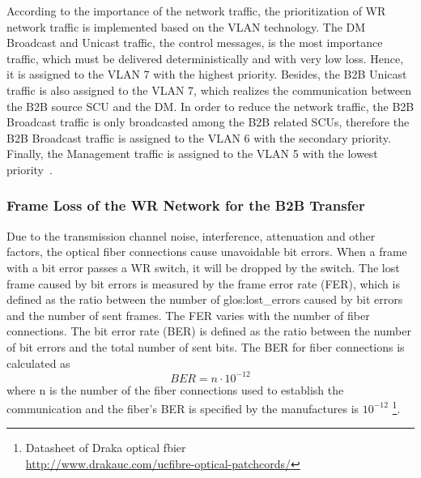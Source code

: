 According to the importance of the network traffic, the prioritization of WR network traffic is implemented based on the VLAN technology. The DM Broadcast and Unicast traffic, the control messages, is the most importance traffic, which must be delivered  deterministically and with very low loss. Hence, it is assigned to the VLAN 7 with the highest priority. Besides, the B2B Unicast traffic is also assigned to the VLAN 7, which realizes the communication between the B2B source SCU and the DM. In order to reduce the network traffic, the B2B Broadcast traffic is only broadcasted among the B2B related SCUs, therefore the B2B Broadcast traffic is assigned to the VLAN 6 with the secondary priority. Finally, the Management traffic is assigned to the VLAN 5 with the lowest priority~\cite{prados_testing_2016}.




\subsubsection{Frame Loss of the WR Network for the B2B Transfer} 

Due to the transmission channel noise, interference, attenuation and other factors, the optical fiber connections cause unavoidable bit errors. When a frame with a bit error passes a WR switch, it will be dropped by the switch. The lost frame caused by bit errors is measured by the frame error rate (\gls{FER}), which is defined as the ratio between the number of \gls{glos:lost_error}s caused by bit errors and the number of sent frames. The FER varies with the number of fiber connections. The bit error rate (\gls{BER}) is defined as the ratio between the number of bit errors and the total number of sent bits. The BER for fiber connections is calculated as~\cite{prados_white_2011} 
\begin{equation}
	BER=n\cdot10^{-12}
\end{equation}
where n is the number of the fiber connections used to establish the communication and the fiber's BER is specified by the manufactures is $10^{-12}$ \footnote{Datasheet of Draka optical fbier \\ \url{http://www.drakauc.com/ucfibre-optical-patchcords/}}. 
 
